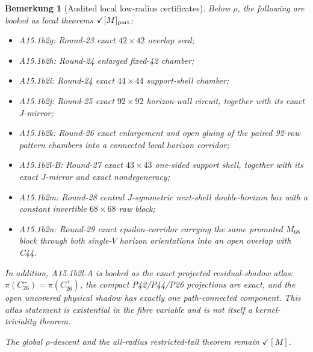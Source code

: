 \documentclass[11pt,a4paper]{amsart}
\newtheorem{remark}[theorem]{Bemerkung}
\begin{document}
\begin{remark}[Audited local low-radius certificates]
Below \(\rho\), the following are booked as local theorems
\(\checkmark[M]_{\rm part}\):
\begin{itemize}
\item A15.1b2g: Round-23 exact \(42\times42\) overlap seed;
\item A15.1b2h: Round-24 enlarged fixed-42 chamber;
\item A15.1b2i: Round-24 exact \(44\times44\) support-shell chamber;
\item A15.1b2j: Round-25 exact \(92\times92\) horizon-wall circuit,
      together with its exact \(J\)-mirror;
\item A15.1b2k: Round-26 exact enlargement and open gluing of the paired
      92-row pattern chambers into a connected local horizon corridor;
\item A15.1b2l-B: Round-27 exact \(43\times43\) one-sided support shell,
      together with its exact \(J\)-mirror and exact nondegeneracy;
\item A15.1b2m: Round-28 central \(J\)-symmetric next-shell
      double-horizon box with a constant invertible \(68\times68\) raw block;
\item A15.1b2n: Round-29 exact epsilon-corridor carrying the same promoted
      \(M_{68}\) block through both single-\(V\) horizon orientations into an
      open overlap with C44.
\end{itemize}
In addition, A15.1b2l-A is booked as the exact projected residual-shadow
atlas: \(\pi(C_{26}^{-})=\pi(C_{26}^{+})\), the compact P42/P44/P26
projections are exact, and the open uncovered physical shadow has exactly one
path-connected component. This atlas statement is existential in the fibre
variable and is not itself a kernel-triviality theorem.

The global \(\rho\)-descent and the all-radius restricted-tail theorem
remain \(\checkmark[M]\).
\end{remark}
\end{document}
